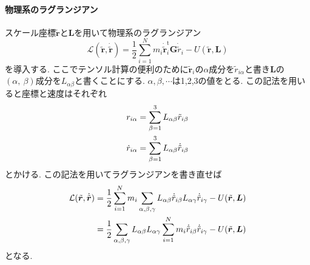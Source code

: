 \paragraph{物理系のラグランジアン}
スケール座標$\tilde{\bm{r}}$と$\bm{L}$を用いて物理系のラグランジアン
\begin{equation}
  \mathcal{L} (\tilde{\bm{r}}, \dot{\tilde{\bm{r}}})
  =
  \frac{1}{2}
  \sum_{i=1}^{N}
  m_{i} \dot{\tilde{\bm{r}}}_{i}^{\mathrm{t}} \bm{G} \dot{\tilde{r}}_{i}
  -
  U(\tilde{\bm{r}}, \bm{L})
\end{equation}
を導入する.
ここでテンソル計算の便利のために$\tilde{\bm{r}}_{i}$の$\alpha$成分を$\tilde{r}_{i\alpha}$と書き$\bm{L}$の$(\alpha,~\beta)$成分を$L_{\alpha \beta}$と書くことにする. 
$\alpha,\beta,\cdots$は1,2,3の値をとる. 
この記法を用いると座標と速度はそれぞれ
\begin{align}
  r_{i \alpha}
 &=
  \sum_{\beta = 1}^{3} L_{\alpha \beta} \tilde{r}_{i\beta}
  \\
  \notag
  \dot{r}_{i \alpha}
 &=
  \sum_{\beta = 1}^{3} L_{\alpha \beta} \dot{\tilde{r}}_{i\beta}
\end{align}
とかける. 
この記法を用いてラグランジアンを書き直せば
\begin{align}
  \mathcal{L} (\tilde{\bm{r}}, \dot{\tilde{\bm{r}}})
 &=
  \frac{1}{2}
  \sum_{i=1}^{N} m_{i}
  \sum_{\alpha,\beta,\gamma}
  L_{\alpha\beta}\dot{\tilde{r}}_{i\beta} L_{\alpha\gamma}\dot{\tilde{r}}_{i\gamma}
  -
  U(\tilde{\bm{r}}, \bm{L})
  \\
  \notag
 &=
  \frac{1}{2}
  \sum_{\alpha,\beta,\gamma}
  L_{\alpha\beta} L_{\alpha\gamma}
  \sum_{i=1}^{N} m_{i}
  \dot{\tilde{r}}_{i\beta} \dot{\tilde{r}}_{i\gamma}
  -
  U(\tilde{\bm{r}}, \bm{L})
\end{align}
となる. 

